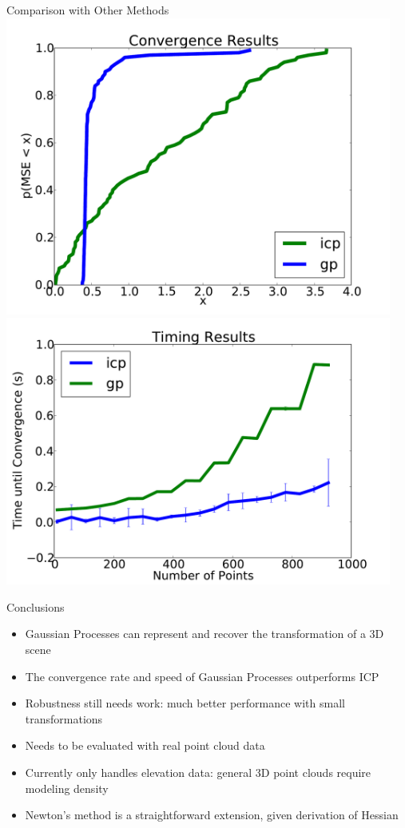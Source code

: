 \documentclass[final]{beamer}
\begin{document}
\begin{frame}{}
\begin{textblock}{27}
\begin{block}{Comparison with Other Methods}
\includegraphics[width=5in]{convergence2.pdf}
\includegraphics[width=5in]{scaling2.pdf}
\end{block}

\begin{block}{Conclusions}
\begin{itemize}
\item Gaussian Processes can represent and recover the transformation of a 3D scene
\item The convergence rate and speed of Gaussian Processes outperforms ICP
\item Robustness still needs work: much better performance with small transformations
\item Needs to be evaluated with real point cloud data
\item Currently only handles elevation data: general 3D point clouds require modeling density
\item Newton's method is a straightforward extension, given derivation of Hessian
\end{itemize}
\end{block}


\end{textblock}

\end{frame}
\end{document}
